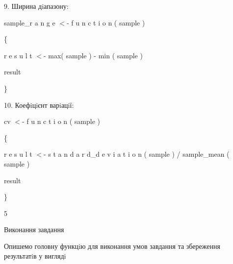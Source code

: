 \documentclass[a4paper,portrait,12pt]{article}
\begin{document}
\begin{flushleft}
9. Ширина дiапазону:
\end{flushleft}


\begin{flushleft}
sample\_r a n g e $<$- f u n c t i o n ( sample )
\end{flushleft}


\{


\begin{flushleft}
r e s u l t $<$- max( sample ) - min ( sample )
\end{flushleft}


\begin{flushleft}
result
\end{flushleft}


\}





\begin{flushleft}
10. Коефiцiєнт варiацiї:
\end{flushleft}


\begin{flushleft}
cv $<$- f u n c t i o n ( sample )
\end{flushleft}


\{


\begin{flushleft}
r e s u l t $<$- s t a n d a r d\_d e v i a t i o n ( sample ) / sample\_mean ( sample )
\end{flushleft}


\begin{flushleft}
result
\end{flushleft}


\}





5










\begin{flushleft}
Виконання завдання
\end{flushleft}





\begin{flushleft}
Опишемо головну функцiю для виконання умов завдання та збереження результатiв у виглядi
\end{flushleft}
\end{document}
